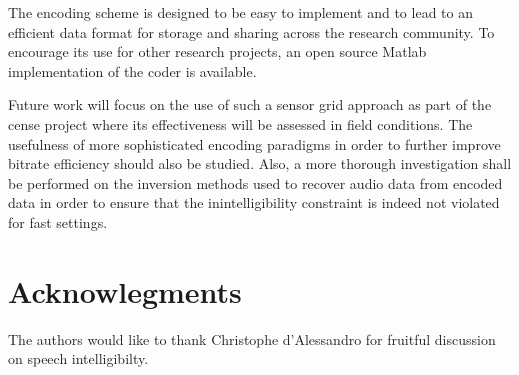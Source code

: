 \documentclass[sensors,article,submit,moreauthors,pdftex,10pt,a4paper]{mdpi}
\begin{document}
The encoding scheme is designed to be easy to implement and to lead to an efficient data format for storage and sharing across the research community. To encourage its use for other research projects, an open source Matlab implementation of the coder is available.



Future work will focus on the use of such a sensor grid approach as part of the cense project where its effectiveness will be assessed in field conditions. The usefulness of more sophisticated encoding paradigms in order to further improve bitrate efficiency should also be studied. Also, a more thorough investigation shall be performed on the inversion methods used to recover audio data from encoded data in order to ensure that the inintelligibility constraint is indeed not violated for fast settings.

\section{Acknowlegments}

The authors would like to thank Christophe d'Alessandro for fruitful discussion on speech intelligibilty.

%


\end{document}
